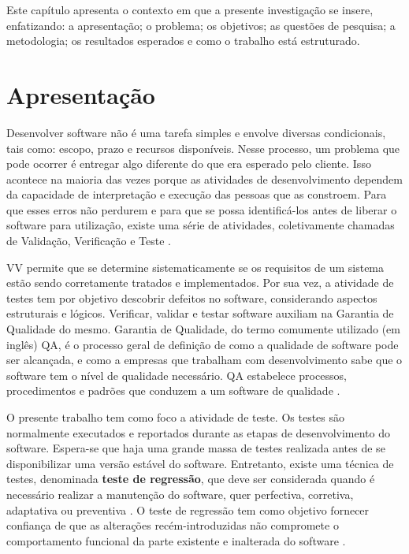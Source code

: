 
\acresetall 


Este capítulo apresenta o contexto em que a presente investigação se insere, enfatizando: a apresentação; o problema; os objetivos; as questões de pesquisa; a metodologia; os resultados esperados e como o trabalho está estruturado.

\section{Apresentação}\label{sec:apresentacao}
Desenvolver software não é uma tarefa simples e envolve diversas condicionais, tais como: escopo, prazo e recursos disponíveis. Nesse processo, um problema que pode ocorrer é entregar algo diferente do que era esperado pelo cliente. Isso acontece na maioria das vezes porque as atividades de desenvolvimento dependem da capacidade de interpretação e execução das pessoas que as constroem. Para que esses erros não perdurem e para que se possa identificá-los antes de liberar o software para utilização, existe uma série de atividades, coletivamente chamadas de Validação, Verificação e Teste \cite{DELAMARO2007}. 

\ac{VV} permite que se determine sistematicamente se os requisitos de um sistema estão sendo corretamente tratados e implementados. Por sua vez, a atividade de testes tem por objetivo descobrir defeitos no software, considerando aspectos estruturais e lógicos. Verificar, validar e testar software auxiliam na Garantia de Qualidade do mesmo. Garantia de Qualidade, do termo comumente utilizado (em inglês) \ac{QA}, é o processo geral de definição de como a qualidade de software pode ser alcançada, e como a empresas que trabalham com desenvolvimento sabe que o software tem o nível de qualidade necessário. \ac{QA} estabelece processos, procedimentos e padrões que conduzem a um software de qualidade \cite{HIRAMA2011}. 

O presente trabalho tem como foco a atividade de teste. Os testes são normalmente executados e reportados durante as etapas de desenvolvimento do software. Espera-se que haja uma grande massa de testes realizada antes de se disponibilizar uma versão estável do software. Entretanto, existe uma técnica de testes, denominada \textbf{teste de regressão}, que deve ser considerada quando é necessário realizar a manutenção do software, quer perfectiva, corretiva, adaptativa ou preventiva \cite{DBLP:series/springer/Mens08}. O teste de regressão tem como objetivo fornecer confiança de que as alterações recém-introduzidas não compromete o comportamento funcional da parte existente e inalterada do software \cite{Yoo:2012:RTM:2284811.2284813}.

